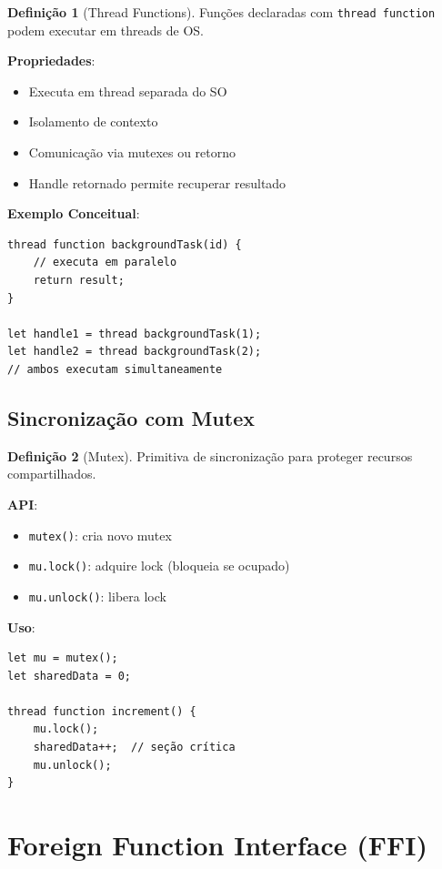 \documentclass[12pt,a4paper]{article}
\theoremstyle{definition}
\newtheorem{definition}{Definição}[section]
\begin{document}
\begin{definition}[Thread Functions]
Funções declaradas com \texttt{thread function} podem executar em threads de OS.

\textbf{Propriedades}:
\begin{itemize}
    \item Executa em thread separada do SO
    \item Isolamento de contexto
    \item Comunicação via mutexes ou retorno
    \item Handle retornado permite recuperar resultado
\end{itemize}

\textbf{Exemplo Conceitual}:
\begin{verbatim}
thread function backgroundTask(id) {
    // executa em paralelo
    return result;
}

let handle1 = thread backgroundTask(1);
let handle2 = thread backgroundTask(2);
// ambos executam simultaneamente
\end{verbatim}
\end{definition}

\subsection{Sincronização com Mutex}

\begin{definition}[Mutex]
Primitiva de sincronização para proteger recursos compartilhados.

\textbf{API}:
\begin{itemize}
    \item \texttt{mutex()}: cria novo mutex
    \item \texttt{mu.lock()}: adquire lock (bloqueia se ocupado)
    \item \texttt{mu.unlock()}: libera lock
\end{itemize}

\textbf{Uso}:
\begin{verbatim}
let mu = mutex();
let sharedData = 0;

thread function increment() {
    mu.lock();
    sharedData++;  // seção crítica
    mu.unlock();
}
\end{verbatim}
\end{definition}

\section{Foreign Function Interface (FFI)}
\end{document}
